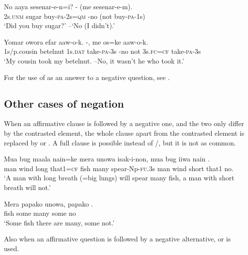 \ea%
\label{ex:x1115}
\gll No  aaya  sesenar-e-n=i?  -  (me  sesenar-e-m). \\
2s.\textsc{unm}  sugar  buy-\textsc{pa}-2s=\textsc{qm}  -no  (not  buy-\textsc{pa}-1s)\\
\glt `Did you buy sugar?' --`No (I didn't).'
\z

\ea%
\label{ex:x1116}
\gll Yomar  owora  efar  aaw-o-k. -,  me  os=ke  aaw-o-k.\\
1s/p.cousin  betelnut  1s.\textsc{dat}  take-\textsc{pa}-3s -no  not  3s.\textsc{fc}=\textsc{cf}  take-\textsc{pa}-3s\\
\glt `My cousin took my betelnut. --No, it wasn't he who took it.'
\z

For the use of  as an answer to a negative question, see .

\subsection{Other cases of negation}
{}
When an affirmative clause is followed by a negative one, and the two only differ by the contrasted element, the whole clause apart from the contrasted element is replaced by  or . A full clause is possible instead of /, but it is not as common.

\ea%
\label{ex:x1119}
\gll Mua  bug  maala  nain=ke  mera  unowa  isak-i-non, mua  bug  iiwa  nain  .\\
man  wind  long  that1=\textsc{cf}  fish  many  spear-Np-\textsc{fu}.3s man  wind  short  that1  no.\\
\glt `A man with long breath (=big lungs) will spear many fish, a man with short breath will not.'
\z

\ea%
\label{ex:x1120}
\gll Mera  papako  unowa,  papako  . \\
fish  some  many  some  no\\
\glt `Some fish there are many, some not.'
\z

Also when an affirmative question is followed by a negative alternative,  or  is used. 

